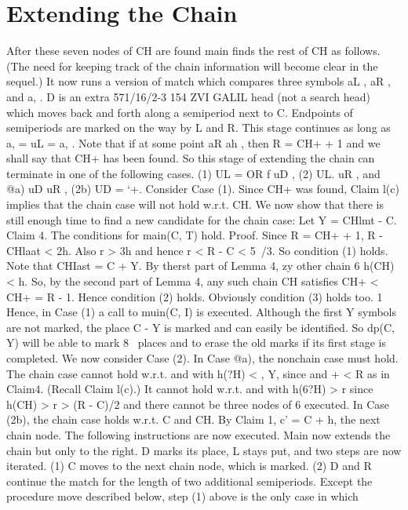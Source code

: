 \documentclass[11pt,a4paper]{report}
\begin{document}
\chapter{Extending the Chain}
After these seven nodes of CH are found main finds the rest of CH as follows. (The
need for keeping track of the chain information will become clear in the sequel.) It now
runs a version of match which compares three symbols aL , aR , and a, . D is an extra
571/16/2-3 
154 ZVI GALIL
head (not a search head) which moves back and forth along a semiperiod next to C.
Endpoints of semiperiods are marked on the way by L and R.
This stage continues as long as a, = uL = a, . Note that if at some point aR ah ,
then R = CH+ + 1 and we shall say that CH+ has been found. So this stage of extending
the chain can terminate in one of the following cases.
(1) UL = OR f uD ,
(2) UL. uR , and
@a) uD  uR ,
(2b) UD = ‘+.
Consider Case (1). Since CH+ was found, Claim l(c) implies that the chain case will
not hold w.r.t. CH. We now show that there is still enough time to find a new candidate
for the chain case: Let Y = CHlmt - C.
Claim 4. The conditions for main(C, T) hold.
Proof. Since R = CH+ + 1, R - CHlaat < 2h. Also r > 3h and hence r < R -
C < 5~/3. So condition (1) holds. Note that CHIast = C + Y. By therst part of Lemma
4, zy other chain 6%
h(CH) < h. So, by the second part of Lemma 4, any such chain CH satisfies CH+ <
CH+ = R - 1. Hence condition (2) holds. Obviously condition (3) holds too. 1
Hence, in Case (1) a call to muin(C, I) is executed. Although the first Y symbols are
not marked, the place C - Y is marked and can easily be identified. So dp(C, Y) will be
able to mark 8~ places and to erase the old marks if its first stage is completed.
We now consider Case (2). In Case @a), the nonchain case must hold. The chain case
cannot hold w.r.t.  and with h(?H) < , Y, since  and + < R as in Claim4. (Recall Claim l(c).)
It cannot hold w.r.t.  and  with h(6?H) > r since h(CH) > r > (R - C)/2 and there
cannot be three nodes of 6%
executed. In Case (2b), the chain case holds w.r.t. C and CH. By Claim 1, c’ = C + h,
the next chain node. The following instructions are now executed.
Main now extends the chain but only to the right. D marks its place, L stays put, and
two steps are now iterated.
(1) C moves to the next chain node, which is marked.
(2) D and R continue the match for the length of two additional semiperiods.
Except the procedure move described below, step (1) above is the only case in which
\end{document}
